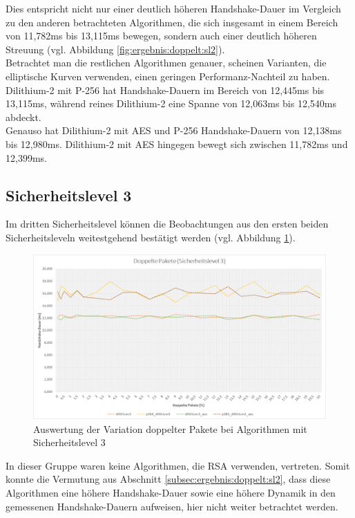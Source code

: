 		Dies entspricht nicht nur einer deutlich höheren Handshake-Dauer im Vergleich zu den anderen betrachteten Algorithmen, die sich insgesamt in einem Bereich von 11,782ms bis 13,115ms bewegen, sondern auch einer deutlich höheren Streuung (vgl. Abbildung \ref{fig:ergebnis:doppelt:sl2}).\\
		
		Betrachtet man die restlichen Algorithmen genauer, scheinen Varianten, die elliptische Kurven verwenden, einen geringen Performanz-Nachteil zu haben. Dilithium-2 mit P-256 hat Handshake-Dauern im Bereich von 12,445ms bis 13,115ms, während reines Dilithium-2 eine Spanne von 12,063ms bis 12,540ms abdeckt.\\
		
		Genauso hat Dilithium-2 mit AES und P-256 Handshake-Dauern von 12,138ms bis 12,980ms. Dilithium-2 mit AES hingegen bewegt sich zwischen 11,782ms und 12,399ms.
		
		\subsection{Sicherheitslevel 3}
		\label{subsec:ergebnis:doppelt:sl3}
		
Im dritten Sicherheitslevel können die Beobachtungen aus den ersten beiden Sicherheitsleveln weitestgehend bestätigt werden (vgl. Abbildung \ref{fig:ergebnis:doppelt:sl3}).		
		
		\begin{figure}[htbp]
			\centering
			\includegraphics[width=\textwidth]{../auswertung/doppelt_sl3.png}
			\caption{Auswertung der Variation doppelter Pakete bei Algorithmen mit Sicherheitslevel 3}
			\label{fig:ergebnis:doppelt:sl3}
		\end{figure}
		
		In dieser Gruppe waren keine Algorithmen, die RSA verwenden, vertreten. Somit konnte die Vermutung aus Abschnitt \ref{subsec:ergebnis:doppelt:sl2}, dass diese Algorithmen eine höhere Handshake-Dauer sowie eine höhere Dynamik in den gemessenen Handshake-Dauern aufweisen, hier nicht weiter betrachtet werden.\\
		
